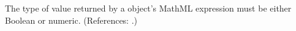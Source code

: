 The type of value returned by a \FunctionDefinition object's 
MathML expression must be either Boolean or numeric.  (References: .)
